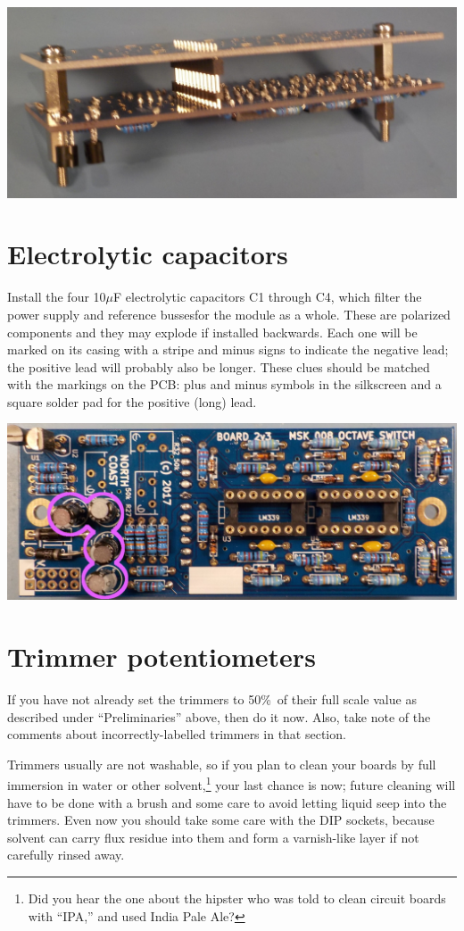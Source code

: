 \noindent\includegraphics[width=\linewidth]{b2b-stack.jpg}

\section{Electrolytic capacitors}

Install the four 10$\mu$F electrolytic capacitors C1 through C4, which
filter the power supply and reference bussesfor the module as a whole. 
These are polarized components and they may explode if installed backwards. 
Each one will be marked on its casing with a stripe and minus signs to
indicate the negative lead; the positive lead will probably also be longer. 
These clues should be matched with the markings on the PCB: plus and minus
symbols in the silkscreen and a square solder pad for the positive (long)
lead.

\noindent\includegraphics[width=\linewidth]{cap-10u.jpg}

\section{Trimmer potentiometers}

If you have not already set the trimmers to 50\%\ of their full scale value
as described under ``Preliminaries'' above, then do it now.  Also, take note
of the comments about incorrectly-labelled trimmers in that section.

Trimmers usually are not washable, so if you plan to clean your boards by
full immersion in water or other solvent,\footnote{Did you hear the one
about the hipster who was told to clean circuit boards with ``IPA,'' and
used India Pale Ale?} your last chance is now; future cleaning will have to
be done with a brush and some care to avoid letting liquid seep into the
trimmers.  Even now you should take some care with the DIP sockets, because
solvent can carry flux residue into them and form a varnish-like layer if
not carefully rinsed away.

